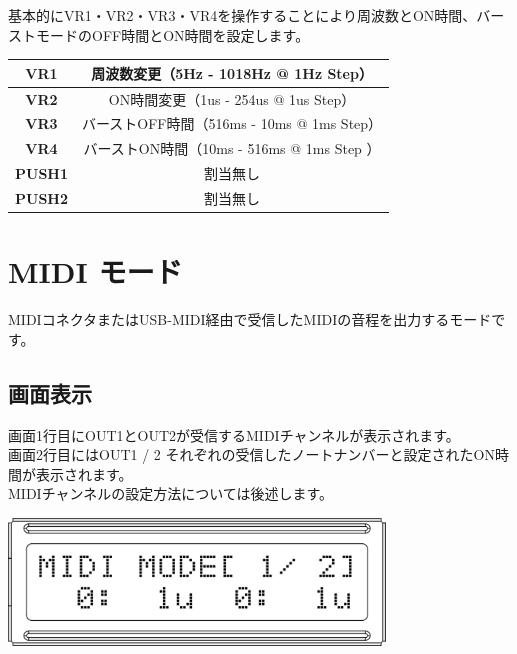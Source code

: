 \documentclass[a4paper,11pt]{jsarticle}
\begin{document}
基本的にVR1・VR2・VR3・VR4を操作することにより周波数とON時間、バーストモードのOFF時間とON時間を設定します。

\vspace*{5mm}

\begin{table}[htbp]
\begin{center}
\begin{tabular}{ | c | c | }
\hline
\textbf{VR1} & 周波数変更（5Hz - 1018Hz @ 1Hz Step） \\\hline
\textbf{VR2} & ON時間変更（1us - 254us @ 1us Step） \\\hline
\textbf{VR3} & バーストOFF時間（516ms - 10ms @ 1ms Step） \\\hline
\textbf{VR4} & バーストON時間（10ms - 516ms @ 1ms Step ） \\\hline
\textbf{PUSH1} & 割当無し \\\hline
\textbf{PUSH2} & 割当無し \\\hline
\end{tabular}
\end{center}
\end{table}



\clearpage

\section{MIDI モード}

MIDIコネクタまたはUSB-MIDI経由で受信したMIDIの音程を出力するモードです。

\subsection{画面表示}

画面1行目にOUT1とOUT2が受信するMIDIチャンネルが表示されます。 \\
画面2行目にはOUT1 / 2 それぞれの受信したノートナンバーと設定されたON時間が表示されます。 \\
MIDIチャンネルの設定方法については後述します。

\vspace*{5mm}
\begin{center}
\includegraphics[width=100mm]{image/Arduino_Interrupter_v1_LCD_MIDI.png}
\end{center}
\vspace*{5mm}
\end{document}

